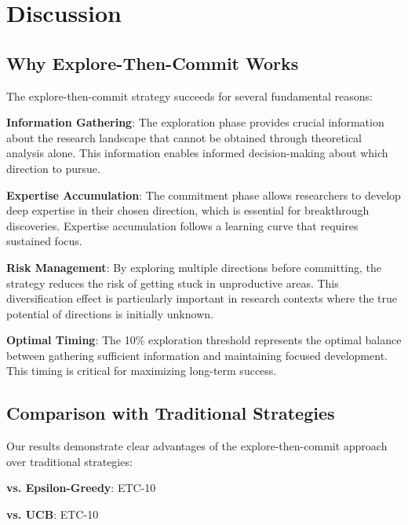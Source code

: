 \documentclass[letterpaper]{article} %
\begin{document}
\section{Discussion}

\subsection{Why Explore-Then-Commit Works}

The explore-then-commit strategy succeeds for several fundamental reasons:

\textbf{Information Gathering}: The exploration phase provides crucial information about the research landscape that cannot be obtained through theoretical analysis alone. This information enables informed decision-making about which direction to pursue.

\textbf{Expertise Accumulation}: The commitment phase allows researchers to develop deep expertise in their chosen direction, which is essential for breakthrough discoveries. Expertise accumulation follows a learning curve that requires sustained focus.

\textbf{Risk Management}: By exploring multiple directions before committing, the strategy reduces the risk of getting stuck in unproductive areas. This diversification effect is particularly important in research contexts where the true potential of directions is initially unknown.

\textbf{Optimal Timing}: The 10\% exploration threshold represents the optimal balance between gathering sufficient information and maintaining focused development. This timing is critical for maximizing long-term success.

\subsection{Comparison with Traditional Strategies}

Our results demonstrate clear advantages of the explore-then-commit approach over traditional strategies:

\textbf{vs. Epsilon-Greedy}: ETC-10%

\textbf{vs. UCB}: ETC-10%
\end{document}
